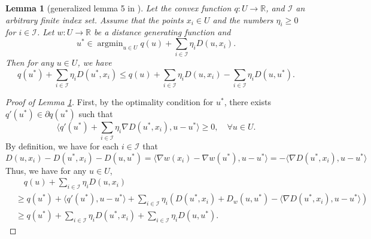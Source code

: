 \documentclass[10pt]{article}
\newcommand{\mc}{\mathcal}
\newcommand{\R}{\mathbb{R}}
\DeclareMathOperator*{\argmin}{argmin}
\newtheorem{lemma}{Lemma}[section]
\begin{document}
\begin{lemma}[generalized lemma 5 in \cite{lan_communication-efficient_2020}]\label{lm:generalized_lm5}
    Let the convex function $q:U\to \R$, and $\mc I$ an arbitrary finite index set. Assume that the points $x_i\in U$ and the numbers $\eta_i\geq 0$ for $i\in \mc I$. Let $w:U\to \R$ be a distance generating function and 
    \begin{displaymath}
        u^* \in \argmin_{u\in U} q(u) + \sum_{i\in \mc I} \eta_i D(u,x_i).
    \end{displaymath}
    Then for any $u\in U$, we have
    \begin{displaymath}
        q(u^*) + \sum_{i\in \mc I} \eta_i D(u^*,x_i) \leq q(u) + \sum_{i\in \mc I} \eta_i D(u,x_i) - \sum_{i\in \mc I} \eta_i D(u,u^*).
    \end{displaymath}
\end{lemma}
\begin{proof}[Proof of Lemma \ref{lm:generalized_lm5}]
    First, by the optimality condition for $u^*$, there exists $q'(u^*)\in \partial q(u^*) $ such that  
    \begin{displaymath}
        \langle q'(u^*) + \sum_{i\in \mc I} \eta_i \nabla D(u^*,x_i), u-u^*\rangle \geq 0,\quad \forall u\in U. 
    \end{displaymath}
    By definition, we have for each $i\in \mc I$ that 
    \begin{displaymath}
        D(u,x_i)- D(u^*,x_i) - D(u,u^*) = \langle \nabla w(x_i) - \nabla w(u^*),u-u^*\rangle =  -\langle \nabla D(u^*,x_i) ,u-u^*\rangle 
    \end{displaymath}
Thus, we have for any $u\in U$, 
\begin{align*}
        &\quad q(u) + \sum_{i\in \mc I} \eta_i D(u,x_i)\\
        &\geq q(u^*) + \langle q'(u^*),u-u^*\rangle + \sum_{i\in \mc I} \eta_i \left( D(u^*,x_i) + D_w(u,u^*) -  \langle \nabla D(u^*,x_i),u-u^*\rangle \right)\\
        &\geq q(u^*)  + \sum_{i\in \mc I} \eta_i  D(u^*,x_i) +\sum_{i\in \mc I} \eta_i  D(u,u^*).
    \end{align*}
\end{proof}
\end{document}
